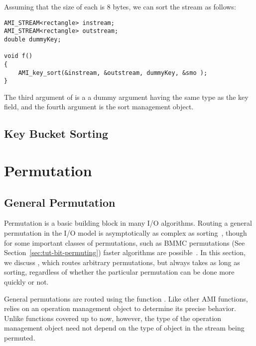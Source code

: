 Assuming that the size of each  is 8 bytes,
we can sort the stream as follows:
 
\begin{verbatim}
AMI_STREAM<rectangle> instream;
AMI_STREAM<rectangle> outstream;
double dummyKey;

void f()
{
    AMI_key_sort(&instream, &outstream, dummyKey, &smo );
}
\end{verbatim}

The third argument of  is a a
dummy argument having the same type as the key field, and
the fourth argument is the sort management
object.




\subsection{Key Bucket Sorting}


\tobewritten


\section{Permutation}

\subsection{General Permutation}

Permutation is a basic building block in many I/O
algorithms. Routing a general permutation in the I/O model
is asymptotically as complex as
sorting~\cite{aggarwal:input}, though for some important
classes of permutations, such as BMMC permutations (See
Section~\ref{sec:tut-bit-permuting}) faster algorithms are
possible~\cite{cormen:fast}. In this section, we discuss
, which routes arbitrary
permutations, but always takes as long as sorting,
regardless of whether the particular permutation can be done
more quickly or not.

General permutations are routed using the function
.  Like other AMI functions,
 relies on an operation management
object to determine its precise
behavior.  Unlike functions covered up to now, however, the type of
the operation management object
need not depend on the type of object in the stream being permuted.

